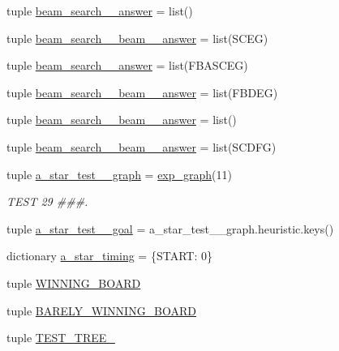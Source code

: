 \begin{DoxyCompactItemize}
\item 
tuple \hyperlink{namespacetests_ae630b7a11ae3117aca8e662e028baa16}{beam\+\_\+search\+\_\+\_\+answer} = list(\textquotesingle{}\textquotesingle{})
\item 
tuple \hyperlink{namespacetests_aa029d5b0ab71cc26e35f61a7004b4833}{beam\+\_\+search\+\_\+\_\+beam\+\_\+\_\+answer} = list(\textquotesingle{}S\+C\+E\+G\textquotesingle{})
\item 
tuple \hyperlink{namespacetests_a387c20c9a461a16a4c6485ee4ddd20b5}{beam\+\_\+search\+\_\+\_\+answer} = list(\textquotesingle{}F\+B\+A\+S\+C\+E\+G\textquotesingle{})
\item 
tuple \hyperlink{namespacetests_a91dd1d08dd312fba0580229b50286438}{beam\+\_\+search\+\_\+\_\+beam\+\_\+\_\+answer} = list(\textquotesingle{}F\+B\+D\+E\+G\textquotesingle{})
\item 
tuple \hyperlink{namespacetests_aedade58ae82945a9c03d099a5dd60694}{beam\+\_\+search\+\_\+\_\+beam\+\_\+\_\+answer} = list(\textquotesingle{}\textquotesingle{})
\item 
tuple \hyperlink{namespacetests_a9dbc940fdc896da1e9579ea1442b19be}{beam\+\_\+search\+\_\+\_\+beam\+\_\+\_\+answer} = list(\textquotesingle{}S\+C\+D\+F\+G\textquotesingle{})
\item 
tuple \hyperlink{namespacetests_adb23c2f6b77c48139361b834568757a9}{a\+\_\+star\+\_\+test\+\_\+\_\+graph} = \hyperlink{namespacetests_a92e10d86ba4b16c56f82cfb53b87747e}{exp\+\_\+graph}(11)
\begin{DoxyCompactList}\small\item\em T\+E\+S\+T 29 \#\#\#. \end{DoxyCompactList}\item 
tuple \hyperlink{namespacetests_a6d49f405fd47e910efb683f0edb3ccdd}{a\+\_\+star\+\_\+test\+\_\+\_\+goal} = a\+\_\+star\+\_\+test\+\_\+\_\+graph.\+heuristic.\+keys()
\item 
dictionary \hyperlink{namespacetests_a3ca3bcdf053d21e7e9248b6f3e68138f}{a\+\_\+star\+\_\+timing} = \{\textquotesingle{}S\+T\+A\+R\+T\textquotesingle{}\+: 0\}
\item 
tuple \hyperlink{namespacetests_ade05507dd3f534c7d8b09196a056cdac}{W\+I\+N\+N\+I\+N\+G\+\_\+\+B\+O\+A\+R\+D}
\item 
tuple \hyperlink{namespacetests_aad7560588da32a5e7c87a112a3171521}{B\+A\+R\+E\+L\+Y\+\_\+\+W\+I\+N\+N\+I\+N\+G\+\_\+\+B\+O\+A\+R\+D}
\item 
tuple \hyperlink{namespacetests_ae96acd0761e0cdd19b1884ce62aab012}{T\+E\+S\+T\+\_\+\+T\+R\+E\+E\+\_}

\end{DoxyCompactItemize}
